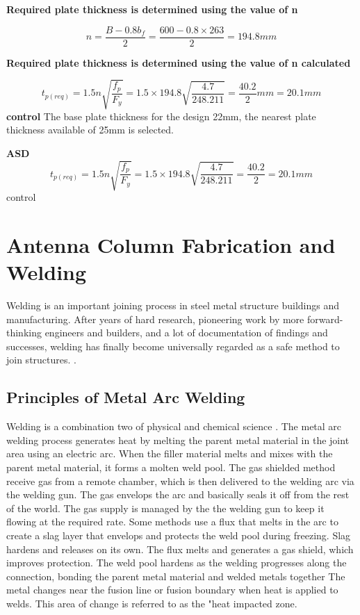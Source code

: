 {\textbf{Required plate thickness is determined using the value of n}

\begin{equation}
n=\frac{{B}-{0}.{8}{b}_{f}}{{2}}=\frac{{600}-{0}.{8}\times{263}}{{2}}=194.8mm
\end{equation}




 \textbf{ Required plate thickness is determined using the value of n calculated}
 
\begin{equation}
{t}_{{p}({req})} = 1.5n \sqrt{\frac{f_{p}}{{F}_{y}}} = 1.5 \times194.8\sqrt{\frac{4.7}{{248}.{211}}}= \frac{40.2}{2}mm = 20.1mm
\end{equation}
\textbf{control}
 The base plate thickness for the design 22mm, the nearest plate thickness available of 25mm is selected.


\textbf{ASD}
\begin{equation}
{t}_{{p}({req})} = 1.5n\sqrt{\frac{f_{p}}{{F}_{y}}} = 1.5 \times194.8\sqrt{\frac{4.7}{{248}.{211}}} = \frac{40.2}{2} = 20.1mm
\end{equation}
control




\section { Antenna Column Fabrication and Welding }
Welding is an important joining process in steel metal structure buildings and manufacturing.
After years of hard research, pioneering work by more forward-thinking engineers and builders, and a lot of documentation of findings and successes, welding has finally become universally regarded as a safe method to join structures. \cite{zaarour1996web}.

\subsection{Principles of Metal Arc Welding}
Welding is a combination two of  physical and chemical science .
The metal arc welding process generates heat by melting the parent metal material in the joint area using an electric arc. When the filler material melts and mixes with the parent metal material, it forms a molten weld pool.
The gas shielded method receive gas from a remote chamber, which is then delivered to the welding arc via the welding gun. The gas envelops the arc and basically seals it off from the rest of the world. The gas supply is managed by the the welding gun to keep it flowing at the required rate. Some methods use a flux that melts in the arc to create a slag layer that envelops and protects the weld pool during freezing. Slag hardens and releases on its own. The flux melts and generates a gas shield, which improves protection. The weld pool hardens as the welding progresses along the connection, bonding the parent metal material and welded metals together
The metal changes near the fusion line or fusion boundary when heat is applied to welds. This area of change is referred to as the "heat impacted zone.



}
